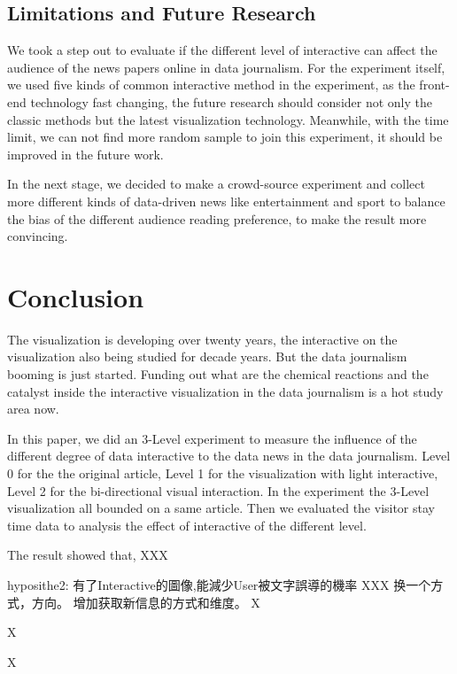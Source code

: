 \documentclass[9pt,journal,compsoc]{IEEEtran}
\begin{document}
\subsection{Limitations and Future Research}

We took a step out to evaluate if the different level of interactive can affect the audience of the news papers online in data journalism. For the experiment itself, we used five kinds of common interactive method in the experiment, as the front-end technology fast changing, the future research should consider not only the classic methods but the latest visualization technology. Meanwhile, with the time limit, we can not find more random sample to join this experiment, it should be improved in the future work.

In the next stage, we decided to make a crowd-source experiment and collect more different kinds of data-driven news like entertainment and sport to balance the bias of the different audience reading preference, to make the result more convincing.

\section{Conclusion}
\large
The visualization is developing over twenty years, the interactive on the visualization also being studied for decade years. But the data journalism booming is just started. Funding out what are the chemical reactions and the catalyst inside the interactive visualization in the data journalism is a hot study area now.

In this paper, we did an 3-Level experiment to measure the influence of the different degree of data interactive to the data news in the data journalism.  Level 0 for the the original article, Level 1 for the visualization with light interactive, Level 2 for the bi-directional visual interaction. In the experiment the 3-Level visualization all bounded on a same article. Then we evaluated the visitor stay time data to analysis the effect of interactive of the different level.

The result showed that, XXX

hyposithe2: 有了Interactive的圖像,能減少User被文字誤導的機率
XXX 换一个方式，方向。 增加获取新信息的方式和维度。
X

X

X
\end{document}
